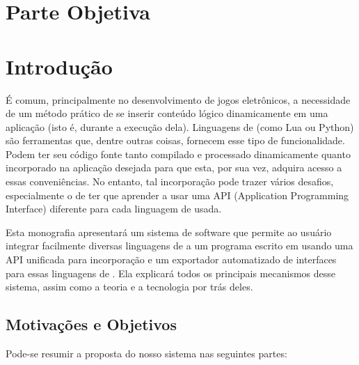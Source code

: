 \chapter*{Parte Objetiva}
\label{sec:parte_objetiva}
\chapter{Introdução}
\label{sec:intr}

É comum, principalmente no desenvolvimento de jogos eletrônicos, a necessidade
de um método prático de se inserir conteúdo lógico dinamicamente em uma
aplicação (isto é, durante a execução dela). Linguagens de \script{} (como Lua ou
Python) são ferramentas que, dentre outras coisas, fornecem esse tipo de
funcionalidade. Podem ter seu código fonte tanto compilado e processado
dinamicamente quanto incorporado na aplicação desejada para que esta, por sua
vez, adquira acesso a essas conveniências. No entanto, tal incorporação pode
trazer vários desafios, especialmente o de ter que aprender a usar uma API
(Application Programming Interface) diferente para cada linguagem de \script{}
usada.

Esta monografia apresentará um sistema de software que permite ao usuário
integrar facilmente diversas linguagens de \script{} a um programa escrito em
\cxx{} usando uma API unificada para incorporação e um exportador
automatizado de interfaces \cxx{} para essas linguagens de \script{}. Ela
explicará todos os principais mecanismos desse sistema, assim como a teoria e a
tecnologia por trás deles.

\section{Motivações e Objetivos}
\label{sec:intr:motivacoes_objetivos}

Pode-se resumir a proposta do nosso sistema nas seguintes partes:

